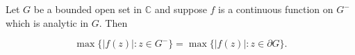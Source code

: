 Let $G$ be a bounded open set in $\mathbb{C}$ and suppose $f$ is a continuous function on $G^{-}$ which is analytic in $G$. Then

$$\max \{|f(z)|: z \in G^{-}\} = \max \{|f(z)|: z \in \partial G\}.$$
